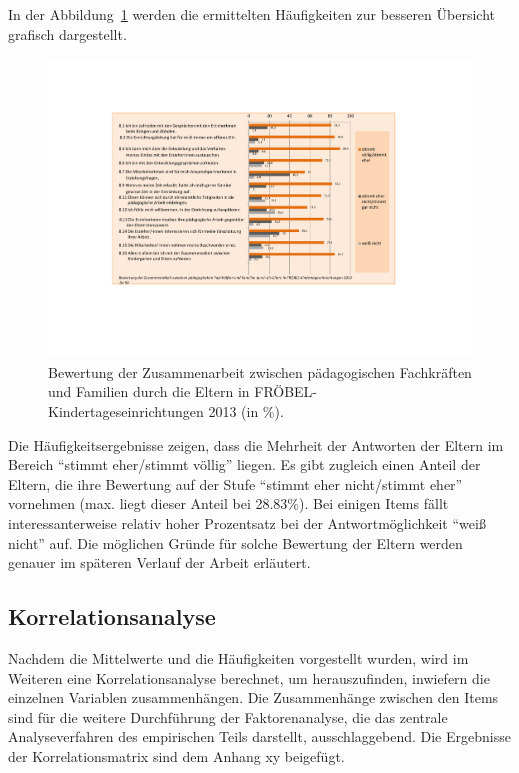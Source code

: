 \documentclass[12pt,a4paper]{article}
\begin{document}
	In der Abbildung~\ref{fig_freq} werden die ermittelten Häufigkeiten zur besseren Übersicht  grafisch dargestellt.

\begin{figure}[h]
\centering
\includegraphics[scale=0.6]{figures/freq_dist2}
\caption{Bewertung der Zusammenarbeit zwischen pädagogischen Fachkräften und Familien durch die Eltern in FRÖBEL-Kindertageseinrichtungen 2013 (in \%).}
\label{fig_freq}
\end{figure}
\FloatBarrier
Die Häufigkeitsergebnisse zeigen, dass die Mehrheit der Antworten der Eltern im Bereich "`stimmt eher/stimmt völlig"' liegen. Es gibt zugleich einen Anteil der Eltern, die ihre Bewertung auf der Stufe "`stimmt eher nicht/stimmt eher"' vornehmen (max. liegt dieser Anteil bei 28.83\%). Bei einigen Items fällt interessanterweise relativ hoher Prozentsatz bei der Antwortmöglichkeit "`weiß nicht"' auf. Die möglichen Gründe für solche Bewertung der Eltern werden genauer im späteren Verlauf der Arbeit erläutert.

\subsection{Korrelationsanalyse}  
Nachdem die Mittelwerte und die Häufigkeiten vorgestellt wurden, wird im Weiteren eine Korrelationsanalyse berechnet, um herauszufinden, inwiefern die einzelnen Variablen zusammenhängen. Die Zusammenhänge zwischen den Items sind für die weitere Durchführung der Faktorenanalyse, die das zentrale Analyseverfahren des empirischen Teils darstellt, ausschlaggebend. Die Ergebnisse der Korrelationsmatrix sind dem Anhang xy beigefügt.
\end{document}
